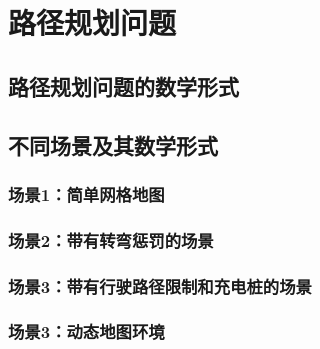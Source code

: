 \documentclass{standalone}
\begin{document}
\chapter{路径规划问题}


\section{路径规划问题的数学形式}
\section{不同场景及其数学形式}
\subsection{场景1：简单网格地图}
\subsection{场景2：带有转弯惩罚的场景}
\subsection{场景3：带有行驶路径限制和充电桩的场景}
\subsection{场景3：动态地图环境}
\end{document}

